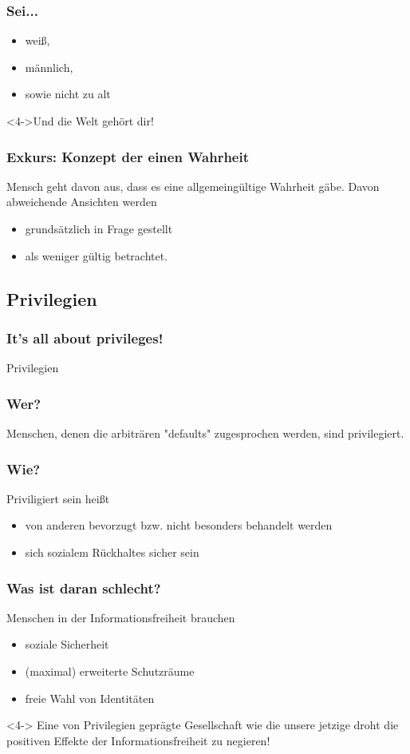 \documentclass{beamer}
\begin{document}
\frame
{
  \frametitle{Sei...}
  
  \begin{itemize}[<+->]
  \item weiß,
  \item männlich,
  \item sowie nicht zu alt
  \end{itemize}
  
  \begin{block}<4->{Und die Welt gehört dir!}
  \end{block}
}
\frame
{
  \frametitle{Exkurs: Konzept der einen Wahrheit}
  
  Mensch geht davon aus, dass es eine allgemeingültige Wahrheit gäbe.
  Davon abweichende Ansichten werden
  \begin{itemize}
    \item grundsätzlich in Frage gestellt
    \item als weniger gültig betrachtet.
  \end{itemize}
}
\subsection{Privilegien}

\frame
{
  \frametitle{It's all about privileges!}
  Privilegien
}
\frame
{
  \frametitle{Wer?}
  
  Menschen, denen die arbiträren "defaults" zugesprochen werden, sind privilegiert.
}
\frame
{
  \frametitle{Wie?}
  
  Priviligiert sein heißt
  \begin{itemize}[<+->]
  \item von anderen bevorzugt bzw. nicht besonders behandelt werden
  \item sich sozialem Rückhaltes sicher sein
  \end{itemize}
}
\frame
{ 
  \frametitle{Was ist daran schlecht?}
  
  Menschen in der Informationsfreiheit brauchen
  \begin{itemize}[<+->]
  \item soziale Sicherheit
  \item (maximal) erweiterte Schutzräume 
  \item freie Wahl von Identitäten
  \end{itemize}
  
  \begin{theorem}<4->
    Eine von Privilegien geprägte Gesellschaft wie die unsere jetzige droht die positiven Effekte der Informationsfreiheit zu negieren! 
  \end{theorem}
}
\end{document}
